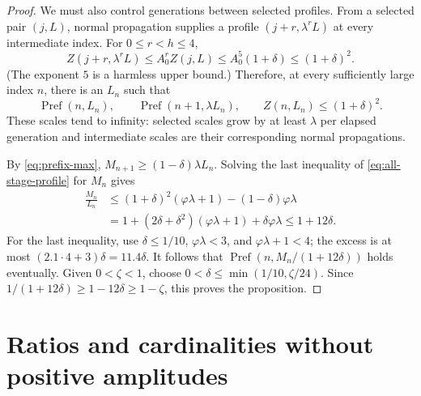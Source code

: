 \documentclass[11pt,letterpaper]{article}
\numberwithin{equation}{section}
\theoremstyle{remark}
\newcommand{\ph}{\varphi}
\begin{document}
\begin{proof}
We must also control generations between selected profiles. From a
selected pair $(j,L)$, normal propagation supplies a profile
$(j+r,\lambda^rL)$ at every intermediate index. For $0\le r<h\le4$,
\[
 Z(j+r,\lambda^rL)\le A_0^r Z(j,L)
 \le A_0^5(1+\delta)\le(1+\delta)^2.
\]
(The exponent $5$ is a harmless upper bound.) Therefore, at every
sufficiently large index $n$, there is an $L_n$ such that
\begin{equation}\label{eq:all-stage-profile}
 \operatorname{Pref}(n,L_n),\qquad
 \operatorname{Pref}(n+1,\lambda L_n),\qquad
 Z(n,L_n)\le(1+\delta)^2.
\end{equation}
These scales tend to infinity: selected scales grow by at least $\lambda$
per elapsed generation and intermediate scales are their corresponding
normal propagations.

By \eqref{eq:prefix-max}, $M_{n+1}\ge(1-\delta)\lambda L_n$.
Solving the last inequality of \eqref{eq:all-stage-profile} for $M_n$ gives
\begin{align*}
 \frac{M_n}{L_n}
 &\le(1+\delta)^2(\ph\lambda+1)-(1-\delta)\ph\lambda\\
 &=1+(2\delta+\delta^2)(\ph\lambda+1)+\delta\ph\lambda
 \le1+12\delta.
\end{align*}
For the last inequality, use $\delta\le1/10$,
$\ph\lambda<3$, and $\ph\lambda+1<4$; the excess is at most
$(2.1\cdot4+3)\delta=11.4\delta$.
It follows that $\operatorname{Pref}(n,M_n/(1+12\delta))$ holds eventually.
Given $0<\zeta<1$, choose $0<\delta\le\min(1/10,\zeta/24)$.
Since $1/(1+12\delta)\ge1-12\delta\ge1-\zeta$, this proves the proposition.
\end{proof}

\section{Ratios and cardinalities without positive amplitudes}
\end{document}
